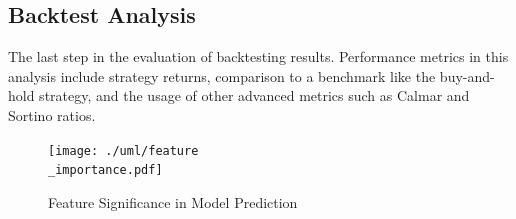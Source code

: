 \subsection{Backtest Analysis}
The last step in the evaluation of backtesting results. Performance metrics in this analysis include strategy returns, comparison to a benchmark like the buy-and-hold strategy, and the usage of other advanced metrics such as Calmar and Sortino ratios.

\begin{figure}
\centering
\texttt{[image: ./uml/feature\\\_importance.pdf]}
\caption{Feature Significance in Model Prediction}
\label{fig:feature_importance}
\end{figure}
